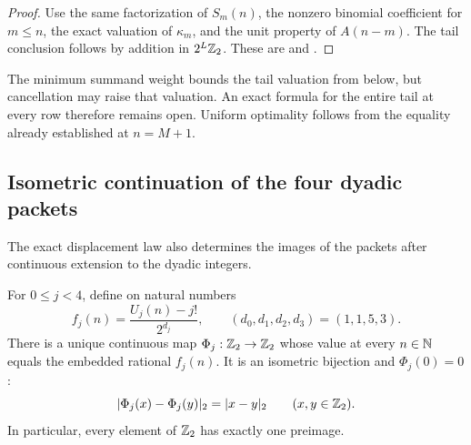 \begin{proof}
Use the same factorization of $S_m(n)$, the nonzero binomial coefficient
for $m\le n$, the exact valuation of $\kappa_m$, and the unit property
of $A(n-m)$.  The tail conclusion follows by addition in $2^L\mathbb Z_2$.
These are  and
.
\end{proof}

The minimum summand weight bounds the tail valuation from below, but
cancellation may raise that valuation.  An exact formula for the entire
tail at every row therefore remains open.  Uniform optimality follows
from the equality already established at $n=M+1$.

\subsection{Isometric continuation of the four dyadic packets}

The exact displacement law also determines the images of the packets
after continuous extension to the dyadic integers.

\begin{theorem}\label{thm:arith-isometry}
For $0\le j<4$, define on natural numbers
\[
 f_j(n)=\frac{U_j(n)-j!}{2^{d_j}},\qquad (d_0,d_1,d_2,d_3)=(1,1,5,3).
\]
There is a unique continuous map $\Phi_j:\mathbb Z_2\to\mathbb Z_2$ whose value at
every $n\in\mathbb N$ equals the embedded rational $f_j(n)$.
It is an isometric bijection and $\Phi_j(0)=0$:
\[
 |\Phi_j(x)-\Phi_j(y)|_2=|x-y|_2\qquad(x,y\in\mathbb Z_2).
\]
In particular, every element of $\mathbb Z_2$ has exactly one preimage.
\end{theorem}

